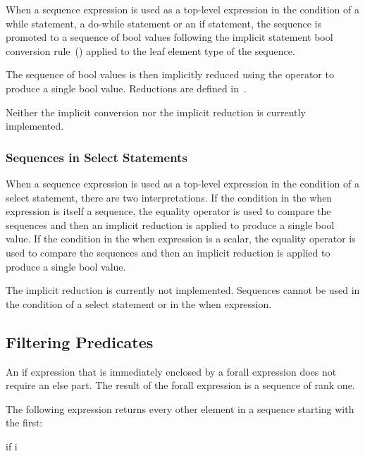 When a sequence expression is used as a top-level expression in the
condition of a while statement, a do-while statement or an if
statement, the sequence is promoted to a sequence of bool values
following the implicit statement bool conversion
rule~() applied to the leaf
element type of the sequence.

The sequence of bool values is then implicitly reduced using
the \chpl{&&} operator to produce a single bool value.  Reductions are
defined in~.

\begin{implementation}
Neither the implicit conversion nor the implicit reduction is
currently implemented.
\end{implementation}

\subsubsection{Sequences in Select Statements}
\label{Sequences_in_Select_Statements}

When a sequence expression is used as a top-level expression in the
condition of a select statement, there are two interpretations.  If
the condition in the when expression is itself a sequence, the
equality operator is used to compare the sequences and then an
implicit \chpl{&&} reduction is applied to produce a single bool
value.  If the condition in the when expression is a scalar, the
equality operator is used to compare the sequences and then an
implicit \chpl{||} reduction is applied to produce a single bool
value.

\begin{implementation}
The implicit reduction is currently not implemented.  Sequences cannot
be used in the condition of a select statement or in the when
expression.
\end{implementation}

\subsection{Filtering Predicates}
\label{Filtering_Predicates}

An if expression that is immediately enclosed by a forall expression
does not require an else part.  The result of the forall expression is
a sequence of rank one.
\begin{example}
The following expression returns every other element in a sequence
starting with the first:
\begin{chapel}
[i in 1..s.length] if i %
\end{chapel}
\end{example}

